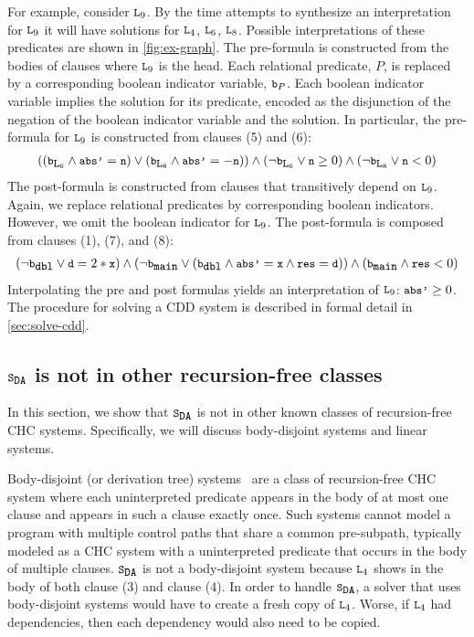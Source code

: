 For example, consider $\cc{L}_9$. By the time \sys attempts to
synthesize an interpretation for $\cc{L}_9$ it will have solutions for
$\cc{L}_4$, $\cc{L}_6$, $\cc{L}_8$.
%
Possible interpretations of these predicates are shown in
\autoref{fig:ex-graph}.
%
The pre-formula is constructed from the bodies of clauses where
$\cc{L}_9$ is the head.
%
Each relational predicate, $P$,
is replaced by a corresponding boolean indicator variable, $\cc{b}_P$.
%
Each boolean indicator variable implies the solution for its
predicate,
encoded as the disjunction of the negation of the boolean
indicator variable and the solution.
%
In particular, the pre-formula for $\cc{L}_9$ is constructed from
clauses (5) and (6):
\begin{gather}
  ((\cc{b}_{\cc{L}_6} \land \cc{abs'} = \cc{n})
  \lor
  (\cc{b}_{\cc{L}_8} \land \cc{abs'} = -\cc{n}))
  \land
  (\neg \cc{b}_{\cc{L}_6} \lor \cc{n} \ge 0)
  \land
  (\neg \cc{b}_{\cc{L}_8} \lor \cc{n} < 0)
\end{gather}
%
The post-formula is constructed from clauses that transitively depend
on $\cc{L}_9$. Again, we replace relational predicates by
corresponding boolean indicators. However, we omit the boolean indicator for
$\cc{L}_9$. The post-formula is composed from clauses (1), (7), and
(8):
\begin{gather}
  (\neg \cc{b}_{\cc{dbl}} \lor \cc{d} = 2*\cc{x})
  \land
  (\neg \cc{b}_{\cc{main}} \lor
    (\cc{b}_{\cc{dbl}}
    \land \cc{abs'}= \cc{x}
    \land \cc{res}=\cc{d} ))
  \land
  (\cc{b}_{\cc{main}} \land \cc{res} < 0)
\end{gather}
%
Interpolating the pre and post formulas yields an interpretation
of $\cc{L}_9$: $\cc{abs'} \geq 0$.
%
The procedure for solving a CDD system is described in formal detail
in \autoref{sec:solve-cdd}.

\subsection{$\mcchc$ is not in other recursion-free classes}
\label{sec:not-in}
%
In this section, we show that $\mcchc$ is not in other
known classes of recursion-free CHC systems. 
%
Specifically, we will
discuss body-disjoint systems and linear systems.
%

Body-disjoint (or derivation tree)
systems~\cite{mcmillan14,bjorner13,heizmann10,rummer13a,rummer13b} are
a class of recursion-free CHC system where each uninterpreted
predicate appears in the body of at most one clause and appears in
such a clause exactly once.
%
Such systems cannot model a program with multiple control paths that
share a common pre-subpath, typically modeled as a CHC system with a
uninterpreted predicate that occurs in the body of multiple clauses.
%
$\mcchc$ is not a body-disjoint system because $\cc{L}_4$ shows in the
body of both clause (3) and clause (4).
%
In order to handle $\mcchc$, a solver that uses
body-disjoint systems would have to create a fresh copy of
$\cc{L}_4$. 
%
Worse, if $\cc{L}_4$ had dependencies, then each dependency would also
need to be copied.

